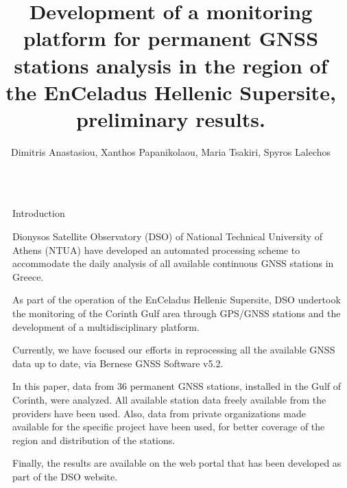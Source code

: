 \documentclass[final,a0,portrait]{beamer}
\title{Development of a monitoring platform for permanent GNSS stations analysis in the region of the EnCeladus Hellenic Supersite, preliminary results.} %
\author{Dimitris Anastasiou, Xanthos Papanikolaou, Maria Tsakiri, Spyros Lalechos}%
\institute{Dionysos Satellite Obseratory, School of Rural Surveying and Geomatics Engineering, NTUA\\ \vspace{0.3em} \par{Earthquake Planning and Protection Organization}} %
\newlength{\sepwid}
\newlength{\onecolwid}
\begin{document}

\setlength{\belowcaptionskip}{2ex} %
\setlength\belowdisplayshortskip{2ex} %

\begin{frame}[t] %

\begin{columns}[t] %

\begin{column}{\sepwid}\end{column} %

\begin{column}{\onecolwid} %


\begin{block}{Introduction}
{\small
Dionysos Satellite Observatory (DSO) of National Technical University of Athens (NTUA)
have developed an automated processing scheme to accommodate the daily analysis of all available continuous GNSS stations in Greece.

As part of the operation of the EnCeladus Hellenic Supersite, DSO undertook the monitoring of the Corinth Gulf area through GPS/GNSS stations and the development of a multidisciplinary platform.

Currently, we have focused our efforts in reprocessing all the available GNSS data up to date, via Bernese GNSS Software v5.2\cite{bernese}.

In this paper, data from 36 permanent GNSS stations, installed in the Gulf of Corinth, were analyzed. All available station data freely available from the providers have been used. Also, data from private organizations made available for the specific project have been used, for better coverage of the region and distribution of the stations. 

Finally, the results are available on the web portal that has been developed as part of the DSO website. 

}
\end{block}
\end{column}
\end{columns}
\end{frame}
\end{document}
